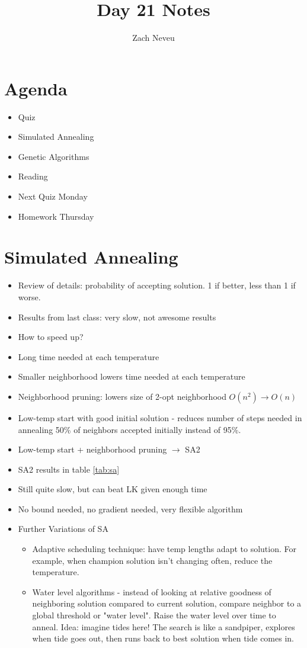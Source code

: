 \documentclass[12pt, letter]{article}
\author{Zach Neveu}
\title{ Day 21 Notes }
\begin{document}
\maketitle
\section{Agenda}%
\label{sec:agenda}
\begin{itemize}
	\item Quiz
	\item Simulated Annealing
	\item Genetic Algorithms
	\item Reading
	\item Next Quiz Monday
	\item Homework Thursday
\end{itemize}

\section{Simulated Annealing}%
\label{sec:simulated_annealing}
\begin{itemize}
	\item Review of details: probability of accepting solution. 1 if better, less than 1 if worse.
	\item Results from last class: very slow, not awesome results
	\item How to speed up?
	\item Long time needed at each temperature
	\item Smaller neighborhood lowers time needed at each temperature
	\item Neighborhood pruning: lowers size of 2-opt neighborhood $O(n^2)\to O(n)$
	\item Low-temp start with good initial solution - reduces number of steps needed in annealing 50\% of neighbors accepted initially instead of 95\%.
	\item Low-temp start + neighborhood pruning $\to$ SA2
	\item SA2 results in table \ref{tab:sa}
	\item Still quite slow, but can beat LK given enough time
	\item No bound needed, no gradient needed, very flexible algorithm
	\item Further Variations of SA
	\begin{itemize}
		\item Adaptive scheduling technique: have temp lengths adapt to solution. For example, when champion solution isn't changing often, reduce the temperature.
		\item Water level algorithms - instead of looking at relative goodness of neighboring solution compared to current solution, compare neighbor to a global threshold or "water level". Raise the water level over time to anneal. Idea: imagine tides here! The search is like a sandpiper, explores when tide goes out, then runs back to best solution when tide comes in.
	\end{itemize}
\end{itemize}
\end{document}
